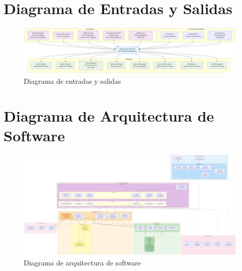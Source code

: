\documentclass{pretexto/report}
\begin{document}
\begin{landscape}
\landscapefancy

\section{Diagrama de Entradas y Salidas}
\begin{figure}[H]
    \centering
    \includegraphics[width=\linewidth]{pngs/e_s.png}
    \caption{Diagrama de entradas y salidas}
\end{figure}

\section{Diagrama de Arquitectura de Software}
\begin{figure}[H]
    \centering
    \includegraphics[width=\linewidth]{pngs/arquitectura.png}
    \caption{Diagrama de arquitectura de software}
\end{figure}

\end{landscape}
\end{document}
